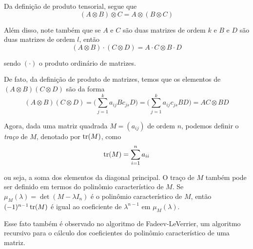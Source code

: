 	\par\vspace{0.3cm} Da definição de produto tensorial, segue que 
	\begin{equation}
	\label{propriedade 1 tensorial}
	(A\otimes B)\otimes C = A\otimes(B\otimes C)
	\end{equation}
	\par\vspace{0.3cm} Além disso, note também que se $A$ e $C$ são duas matrizes de ordem $k$ e $B$ e  $D$ são duas matrizes de ordem $l$, então
	\begin{equation}
	\label{propriedade 2 tensorial}
	(A\otimes B)\cdot(C\otimes D) = A\cdot C\otimes B\cdot D
	\end{equation}
	\par\vspace{0.3cm} sendo $(\cdot)$ o produto ordinário de matrizes.
	\par\vspace{0.3cm} De fato, da definição de produto de matrizes, temos que os elementos de $(A\otimes B)(C\otimes D)$ são da forma
	\begin{equation*}
	(A\otimes B)(C\otimes D) = \Bigg(\displaystyle{ \sum_{j=1}^{k}a_{ij}Bc_{js}D}\Bigg) = \Bigg(\displaystyle{ \sum_{j=1}^{k}a_{ij}c_{js}}BD\Bigg) = AC\otimes BD 
	\end{equation*}
	\par\vspace{0.3cm} Agora, dada uma matriz quadrada $M = (a_{ij})$ de ordem $n$, podemos definir o \textit{traço} de $M$, denotado por $\operatorname{tr}(M)$, como
	\begin{equation*}
	\operatorname{tr}(M) = \sum_{i=1}^{n}a_{ii} 
	\end{equation*}
	\par\vspace{0.3cm} ou seja, a soma dos elementos da diagonal principal. O traço de $M$ também pode ser definido em termos do polinômio característico de $M$. Se $\mu_M(\lambda) = \det(M - \lambda I_n)$ é o polinômio característico	de $M$, então $(-1)^{n-1}\operatorname{tr}(M)$ é igual ao coeficiente de $\lambda^{n-1}$ em $\mu_M(\lambda)$. %
	\par\vspace{0.3cm} Esse fato também é observado no algoritmo de Fadeev-LeVerrier, um algoritmo recursivo para o cálculo dos coeficientes do polinômio característico de uma matriz. 
